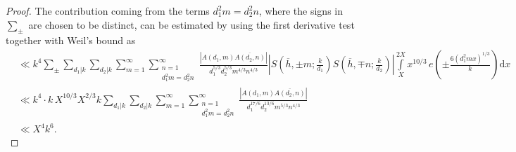 \documentclass[a4paper,10pt,twoside]{amsart}
\theoremstyle{definition}
\numberwithin{equation}{section}
\renewcommand\d{\textnormal{ d}}
\renewcommand\:{\colon}
\begin{document}
\begin{proof}
The contribution coming from the terms $d_1^2m=d_2^2n$, where the signs in $\sum_\pm$ are chosen to be distinct, can be estimated by using the first derivative test together with Weil's bound as
\begin{align*}
&\ll k^4\sum_\pm\sum_{d_1|k}\sum_{d_2|k}\sum_{m=1}^\infty\sum_{\substack{n=1\\d_1^2m=d_2^2n}}^\infty\frac{\left|A(d_1,m)\overline{A(d_2,n)}\right|}{d_1^{5/3}d_2^{5/3}m^{4/3}n^{4/3}}\left|S\left(\overline h,\pm m;\frac k{d_1}\right)S\left(\overline h,\mp n;\frac k{d_2}\right)\right|\int\limits_X^{2X}x^{10/3}\,e\!\left(\pm\frac{6(d_1^2mx)^{1/3}}k\right)\mathrm dx\\
&\ll k^4\cdot k\,X^{10/3}X^{2/3}k\sum_{d_1|k}\sum_{d_2|k}\sum_{m=1}^\infty\sum_{\substack{n=1\\d_1^2m=d_2^2n}}^\infty\frac{\left|A(d_1,m)\overline{A(d_2,n)}\right|}{d_1^{17/6}d_2^{13/6}m^{5/3}n^{4/3}}\\
&\ll X^{4}k^{6}.
\end{align*}    


\end{proof}
\end{document}
